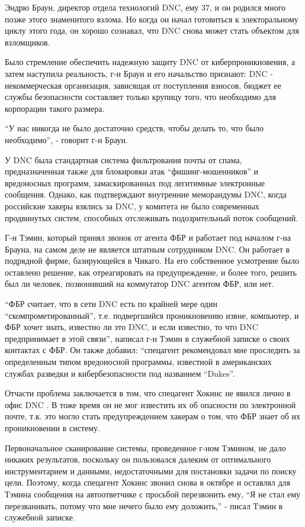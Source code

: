 Эндрю Браун, директор отдела технологий DNC, ему 37, и он родился много
позже этого знаменитого взлома. Но когда он начал готовиться к
электоральному циклу этого года, он хорошо сознавал, что DNC снова может
стать объектом для взломщиков.

Было стремление обеспечить надежную защиту DNC от киберпроникновения, а
затем наступила реальность, г-н Браун и его начальство признают: DNC -
некоммерческая организация, зависящая от поступления взносов, бюджет ее
службы безопасности составляет только крупицу того, что необходимо для
корпорации такого размера.

``У нас никогда не было достаточно средств, чтобы делать то, что было
необходимо'', - говорит г-н Браун.

У DNC была стандартная система фильтрования почты от спама,
предназначенная также для блокировки атак ``фишинг-мошенников'' и
вредоносных программ, замаскированных под легитимные электронные
сообщения. Однако, как подтверждают внутренние меморандумы DNC, когда
российские хакеры взялись за DNC, у комитета не было современных
продвинутых систем, способных отслеживать подозрительный поток
сообщений.

Г-н Тэмин, который принял звонок от агента ФБР и работает под началом
г-на Брауна, на самом деле не является штатным сотрудником DNC. Он
работает в подрядной фирме, базирующейся в Чикаго. На его собственное
усмотрение было оставлено решение, как отреагировать на предупреждение,
и более того, решить был ли человек, позвонивший на коммутатор DNC
агентом ФБР, или нет.

``ФБР считает, что в сети DNC есть по крайней мере один
``скомпрометированный'', т.е. подвергшийся проникновению извне,
компьютер, и ФБР хочет знать, известно ли это DNC, и если известно, то
что DNC предпринимает в этой связи'', написал г-н Тэмин в служебной
записке о своих контактах с ФБР. Он также добавил: ``спецагент
рекомендовал мне проследить за определенным типом вредоносной программы,
известной в американских службах разведки и кибербезопасности под
названием ``Dukes''.

Отчасти проблема заключается в том, что спецагент Хокинс не явился лично
в офис DNC . В тоже время он не мог известить их об опасности по
электронной почте, т.к. это могло стать предупреждением хакерам о том,
что ФБР знает об их проникновении в систему.

Первоначальное сканирование системы, проведенное г-ном Тэмином, не дало
никаких результатов, поскольку он пользовался далеким от оптимального
инструментарием и данными, недостаточными для постановки задачи по
поиску цели. Поэтому, когда спецагент Хокинс звонил снова в октябре и
оставлял для Тэмина сообщения на автоответчике с просьбой перезвонить
ему, ``Я не стал ему перезванивать, потому что мне нечего было ему
доложить,'' - писал Тэмин в служебной записке.

